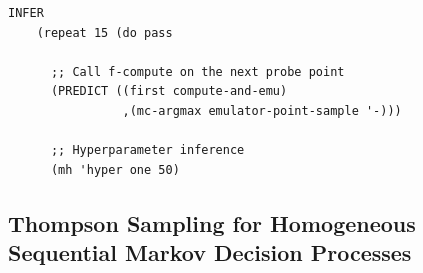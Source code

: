 \documentclass[a0,portrait]{a0poster}
\begin{document}
\begin{multicols}{3}
\begin{minipage}{\linewidth}
\begin{lstlisting}[frame=single,label=alg:structureVent,caption=Venture Code for Bayesian Optimization,mathescape]
INFER
    (repeat 15 (do pass

      ;; Call f-compute on the next probe point
      (PREDICT ((first compute-and-emu)
                ,(mc-argmax emulator-point-sample '-)))
                
      ;; Hyperparameter inference
      (mh 'hyper one 50)
\end{lstlisting}
\end{minipage}
      
\subsection*{Thompson Sampling for Homogeneous Sequential Markov Decision Processes}




\end{multicols}
\end{document}
